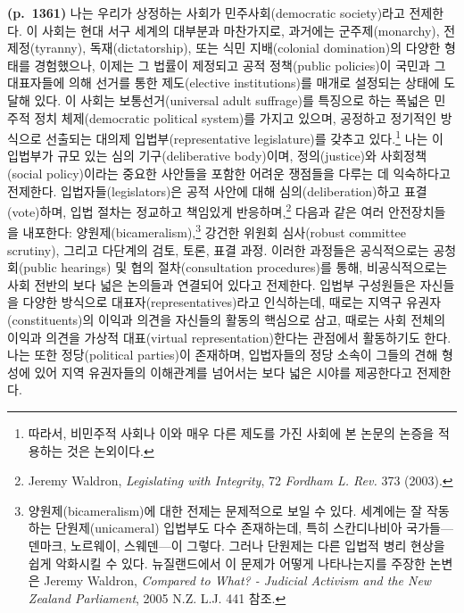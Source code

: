 \documentclass[a4paper,12pt,oneside]{article}  %
\begin{document}
\textbf{(p.~1361)} 나는 우리가 상정하는 사회가 민주사회(democratic
society)라고 전제한다. 이 사회는 현대 서구 세계의 대부분과 마찬가지로,
과거에는 군주제(monarchy), 전제정(tyranny), 독재(dictatorship), 또는
식민 지배(colonial domination)의 다양한 형태를 경험했으나, 이제는 그
법률이 제정되고 공적 정책(public policies)이 국민과 그 대표자들에 의해
선거를 통한 제도(elective institutions)를 매개로 설정되는 상태에 도달해
있다. 이 사회는 보통선거(universal adult suffrage)를 특징으로 하는
폭넓은 민주적 정치 체제(democratic political system)를 가지고 있으며,
공정하고 정기적인 방식으로 선출되는 대의제 입법부(representative
legislature)를 갖추고 있다.\footnote{따라서, 비민주적 사회나 이와 매우
  다른 제도를 가진 사회에 본 논문의 논증을 적용하는 것은 논외이다.} 나는
이 입법부가 규모 있는 심의 기구(deliberative body)이며, 정의(justice)와
사회정책(social policy)이라는 중요한 사안들을 포함한 어려운 쟁점들을
다루는 데 익숙하다고 전제한다. 입법자들(legislators)은 공적 사안에 대해
심의(deliberation)하고 표결(vote)하며, 입법 절차는 정교하고 책임있게
반응하며,\footnote{Jeremy Waldron, \emph{Legislating with Integrity}, 72
  \emph{Fordham L. Rev.} 373 (2003).} 다음과 같은 여러 안전장치들을
내포한다: 양원제(bicameralism),\footnote{양원제(bicameralism)에 대한
  전제는 문제적으로 보일 수 있다. 세계에는 잘 작동하는
  단원제(unicameral) 입법부도 다수 존재하는데, 특히 스칸디나비아
  국가들---덴마크, 노르웨이, 스웨덴---이 그렇다. 그러나 단원제는 다른
  입법적 병리 현상을 쉽게 악화시킬 수 있다. 뉴질랜드에서 이 문제가
  어떻게 나타나는지를 주장한 논변은 Jeremy Waldron, \emph{Compared to
  What? - Judicial Activism and the New Zealand Parliament}, 2005 N.Z.
  L.J. 441 참조.} 강건한 위원회 심사(robust committee scrutiny), 그리고
다단계의 검토, 토론, 표결 과정. 이러한 과정들은 공식적으로는
공청회(public hearings) 및 협의 절차(consultation procedures)를 통해,
비공식적으로는 사회 전반의 보다 넓은 논의들과 연결되어 있다고 전제한다.
입법부 구성원들은 자신들을 다양한 방식으로 대표자(representatives)라고
인식하는데, 때로는 지역구 유권자(constituents)의 이익과 의견을 자신들의
활동의 핵심으로 삼고, 때로는 사회 전체의 이익과 의견을 가상적
대표(virtual representation)한다는 관점에서 활동하기도 한다. 나는 또한
정당(political parties)이 존재하며, 입법자들의 정당 소속이 그들의 견해
형성에 있어 지역 유권자들의 이해관계를 넘어서는 보다 넓은 시야를
제공한다고 전제한다.
\end{document}
